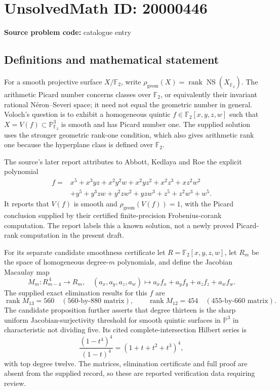 \documentclass[11pt]{article}
\newcommand{\F}{\mathbb{F}}
\newcommand{\PP}{\mathbb{P}}
\begin{document}
\section*{UnsolvedMath ID: 20000446}
\textbf{Source problem code:} catalogue entry
\subsection{Definitions and mathematical statement}
For a smooth projective surface \(X/\F_2\), write \(\rho_{\mathrm{geom}}(X)=\operatorname{rank}\operatorname{NS}(X_{\overline{\F}_2})\). The arithmetic Picard number concerns classes over \(\F_2\), or equivalently their invariant rational N\'eron--Severi space; it need not equal the geometric number in general. Voloch's question is to exhibit a homogeneous quintic \(f\in\F_2[x,y,z,w]\) such that \(X=V(f)\subset\PP^3_{\F_2}\) is smooth and has Picard number one. The supplied solution uses the stronger geometric rank-one condition, which also gives arithmetic rank one because the hyperplane class is defined over \(\F_2\).

The source's later report attributes to Abbott, Kedlaya and Roe the explicit polynomial
\[
\begin{aligned}
 f={}&x^5+x^3yz+x^2y^2w+x^2yz^2+x^2z^3+xz^2w^2\\
    &+y^5+y^3zw+y^2zw^2+yzw^3+z^5+z^2w^3+w^5.
\end{aligned}
\]
It reports that \(V(f)\) is smooth and \(\rho_{\mathrm{geom}}(V(f))=1\), with the Picard conclusion supplied by their certified finite-precision Frobenius-corank computation. The report labels this a known solution, not a newly proved Picard-rank computation in the present draft.

For its separate candidate smoothness certificate let \(R=\F_2[x,y,z,w]\), let \(R_m\) be the space of homogeneous degree-\(m\) polynomials, and define the Jacobian Macaulay map
\[
 M_m:R_{m-4}^{\,4}\longrightarrow R_m,\quad
 (a_x,a_y,a_z,a_w)\longmapsto
 a_xf_x+a_yf_y+a_zf_z+a_wf_w.
\]
The supplied exact elimination results for this \(f\) are
\[
 \operatorname{rank}M_{13}=560\quad(560\text{-by-}880\text{ matrix}),\qquad
 \operatorname{rank}M_{12}=454\quad(455\text{-by-}660\text{ matrix}).
\]
The candidate proposition further asserts that degree thirteen is the sharp uniform Jacobian-surjectivity threshold for smooth quintic surfaces in \(\PP^3\) in characteristic not dividing five. Its cited complete-intersection Hilbert series is
\[
 \frac{(1-t^4)^4}{(1-t)^4}=(1+t+t^2+t^3)^4,
\]
with top degree twelve. The matrices, elimination certificate and full proof are absent from the supplied record, so these are reported verification data requiring review.
\end{document}
